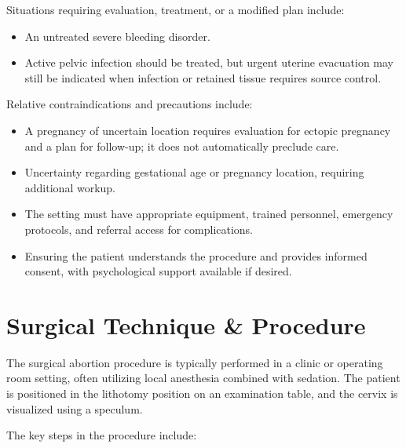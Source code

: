 Situations requiring evaluation, treatment, or a modified plan include:

\begin{itemize}
  \item An untreated severe bleeding disorder.
  \item Active pelvic infection should be treated, but urgent uterine evacuation may still be indicated when infection or retained tissue requires source control.
\end{itemize}

Relative contraindications and precautions include:

\begin{itemize}
  \item A pregnancy of uncertain location requires evaluation for ectopic pregnancy and a plan for follow-up; it does not automatically preclude care.
  \item Uncertainty regarding gestational age or pregnancy location, requiring additional workup.
  \item The setting must have appropriate equipment, trained personnel, emergency protocols, and referral access for complications.
  \item Ensuring the patient understands the procedure and provides informed consent, with psychological support available if desired.
\end{itemize}

\section*{Surgical Technique \& Procedure}
The surgical abortion procedure is typically performed in a clinic or operating room setting, often utilizing local anesthesia combined with sedation. The patient is positioned in the lithotomy position on an examination table, and the cervix is visualized using a speculum.

The key steps in the procedure include:

